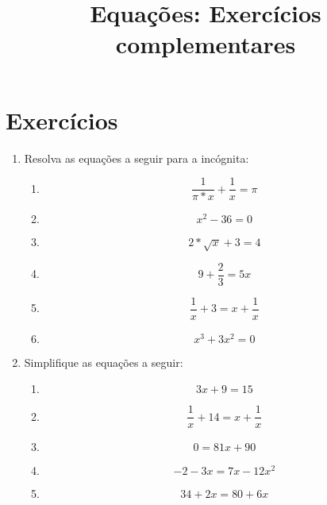 \documentclass[12pt]{article}
\begin{document}
\title{Equações: Exercícios complementares}
\date{}
\maketitle

\newpage

\section{Exercícios}
\begin{enumerate}
	\item Resolva as equações a seguir para a incógnita:
	\begin{enumerate}
		\item $$\frac{1}{\pi*x}+\frac{1}{x} = \pi$$
		\item $$x^2 - 36 = 0$$
		\item $$2*\sqrt{x} + 3 = 4$$
		\item $$9 + \frac{2}{3} = 5x$$
		\item $$\frac{1}{x} + 3 = x + \frac{1}{x}$$
		\item $$x^3 + 3x^2 = 0$$
	\end{enumerate}

	\item Simplifique as equações a seguir:
	\begin{enumerate}
		\item $$3x + 9 = 15$$
		\item $$\frac{1}{x} + 14 = x + \frac{1}{x}$$
		\item $$0 = 81x + 90$$
		\item $$-2 -3x = 7x - 12x^2$$
		\item $$34 + 2x = 80 + 6x$$
	\end{enumerate}
\end{enumerate}

\newpage
\end{document}
